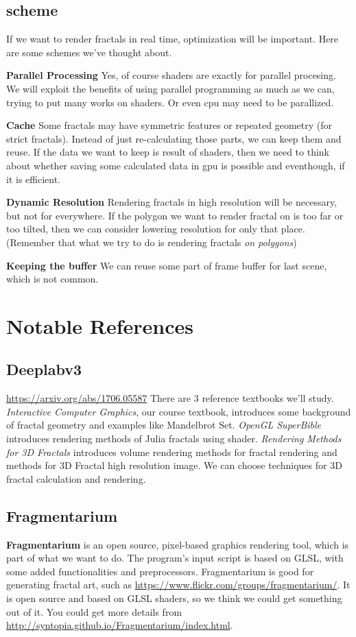 \documentclass[a4paper]{article}
\begin{document}
\subsection{scheme}
If we want to render fractals in real time, optimization will be important.
Here are some schemes we've thought about.

\textbf{Parallel Processing}
Yes, of course shaders are exactly for parallel procesing.
We will exploit the benefits of using parallel programming as much as we can, trying to put many works on shaders.
Or even cpu may need to be parallized.

\textbf{Cache}
Some fractals may have symmetric features or repeated geometry (for strict fractals).
Instead of just re-calculating those parts, we can keep them and reuse.
If the data we want to keep is result of shaders, then we need to think about whether saving some calculated data in gpu is possible and eventhough, if it is efficient.

\textbf{Dynamic Resolution}
Rendering fractals in high resolution will be necessary, but not for everywhere.
If the polygon we want to render fractal on is too far or too tilted, then we can consider lowering resolution for only that place.
(Remember that what we try to do is rendering fractals \textit{on polygons})

\textbf{Keeping the buffer}
We can reuse some part of frame buffer for last scene, which is not common.


\section{Notable References}
\subsection{Deeplabv3}
\url{https://arxiv.org/abs/1706.05587}
There are 3 reference textbooks we'll study.
\textit{Interactive Computer Graphics}\cite{c1}, our course textbook, introduces some background of fractal geometry and examples like Mandelbrot Set.
\textit{OpenGL SuperBible}\cite{c2} introduces rendering methods of Julia fractals using shader.
\textit{Rendering Methods for 3D Fractals}\cite{c3} introduces volume rendering methods for fractal rendering and methods for 3D Fractal high resolution image. We can choose techniques for 3D fractal calculation and rendering.

\subsection{Fragmentarium}
\textbf{Fragmentarium} is an open source, pixel-based graphics rendering tool, which is part of what we want to do.
The program's input script is based on GLSL, with some added functionalities and preprocessors.
Fragmentarium is good for generating fractal art, such as \url{https://www.flickr.com/groups/fragmentarium/}.
It is open source and based on GLSL shaders, so we think we could get something out of it.
You could get more details from \url{http://syntopia.github.io/Fragmentarium/index.html}.
\end{document}

